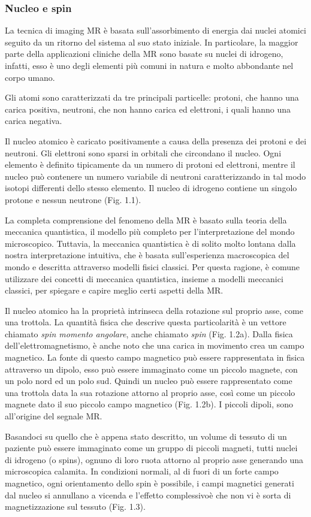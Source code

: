 \documentclass[leqno,10pt,twocolumn,a4paper]{article}
\begin{document}
	\subsubsection{Nucleo e spin} 	
	La tecnica di imaging MR è basata sull'assorbimento di energia dai nuclei atomici seguito da un ritorno del sistema al suo stato iniziale. In particolare, la maggior parte della applicazioni cliniche della MR sono 
	basate su nuclei di idrogeno, infatti, esso è uno degli elementi più comuni in natura e molto
	abbondante nel corpo umano.\par Gli atomi sono caratterizzati da tre principali particelle: protoni, che hanno una carica positiva, neutroni, che non hanno carica ed elettroni, i quali hanno una carica negativa. \par Il nucleo
	atomico è caricato positivamente a causa della presenza dei protoni e dei neutroni. Gli elettroni sono sparsi in orbitali che circondano il nucleo. Ogni elemento è definito tipicamente da un numero di protoni ed elettroni,
	mentre il nucleo può contenere un numero variabile di neutroni caratterizzando in tal modo isotopi differenti dello stesso elemento. Il nucleo di idrogeno contiene un singolo protone e nessun neutrone (Fig. 1.1).
	\par La completa comprensione del fenomeno della MR è basato sulla teoria della meccanica quantistica, il modello più completo per l'interpretazione del mondo microscopico. Tuttavia, la meccanica quantistica è di solito
	molto lontana dalla nostra interpretazione intuitiva, che è basata sull'esperienza macroscopica del mondo e descritta attraverso modelli fisici classici. Per questa ragione, è comune utilizzare dei concetti di meccanica
	quantistica, insieme a modelli meccanici classici, per spiegare e capire meglio certi aspetti della MR. \par Il nucleo atomico ha la proprietà intrinseca della rotazione sul proprio asse, come una trottola. La quantità fisica
	che descrive questa particolarità è un vettore chiamato \textit{spin momento angolare}, anche chiamato \textit{spin} (Fig. 1.2a). Dalla fisica dell'elettromagnetismo, è anche noto che una carica in movimento crea un 
	campo magnetico. La fonte di questo campo magnetico può essere rappresentata in fisica attraverso un dipolo, esso può essere immaginato come un piccolo magnete, con un polo nord ed un polo sud. Quindi un nucleo
	può essere rappresentato come una trottola data la sua rotazione attorno al proprio asse, così come un piccolo magnete dato il suo piccolo campo magnetico (Fig. 1.2b). I piccoli dipoli, sono all'origine del segnale MR.
	\par Basandoci su quello che è appena stato descritto, un volume di tessuto di un paziente può essere immaginato come un gruppo di piccoli magneti, tutti nuclei di idrogeno (o spins), ognuno di loro ruota attorno al proprio
	asse generando una microscopica calamita. In condizioni normali, al di fuori di un forte campo magnetico, ogni orientamento dello spin è possibile, i campi magnetici generati dal nucleo si annullano a vicenda e l'effetto
	complessivoè che non vi è sorta di magnetizzazione sul tessuto (Fig. 1.3).
\end{document}
